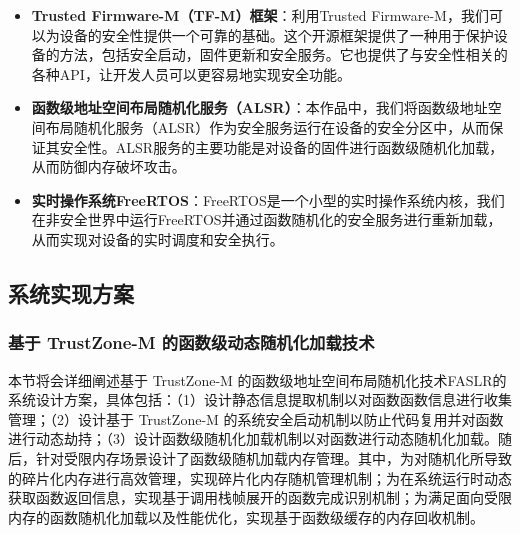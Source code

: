 \documentclass[UTF8,12pt,a4paper,twoside]{ctexart}
\numberwithin{figure}{section}
\begin{document}
\begin{itemize}
    \item \textbf{Trusted Firmware-M（TF-M）框架}：利用Trusted Firmware-M，我们可以为设备的安全性提供一个可靠的基础。这个开源框架提供了一种用于保护设备的方法，包括安全启动，固件更新和安全服务。它也提供了与安全性相关的各种API，让开发人员可以更容易地实现安全功能。
    \item \textbf{函数级地址空间布局随机化服务（ALSR）}：本作品中，我们将函数级地址空间布局随机化服务（ALSR）作为安全服务运行在设备的安全分区中，从而保证其安全性。ALSR服务的主要功能是对设备的固件进行函数级随机化加载，从而防御内存破坏攻击。
    \item \textbf{实时操作系统FreeRTOS}：FreeRTOS是一个小型的实时操作系统内核，我们在非安全世界中运行FreeRTOS并通过函数随机化的安全服务进行重新加载，从而实现对设备的实时调度和安全执行。
\end{itemize}

\subsection{系统实现方案}

\subsubsection{基于 TrustZone-M 的函数级动态随机化加载技术}
\par 本节将会详细阐述基于 TrustZone-M 的函数级地址空间布局随机化技术FASLR的系统设计方案，具体包括：（1）设计静态信息提取机制以对函数函数信息进行收集管理；（2）设计基于 TrustZone-M 的系统安全启动机制以防止代码复用并对函数进行动态劫持；（3）设计函数级随机化加载机制以对函数进行动态随机化加载。随后，针对受限内存场景设计了函数级随机加载内存管理。其中，为对随机化所导致的碎片化内存进行高效管理，实现碎片化内存随机管理机制；为在系统运行时动态获取函数返回信息，实现基于调用栈帧展开的函数完成识别机制；为满足面向受限内存的函数随机化加载以及性能优化，实现基于函数级缓存的内存回收机制。
\end{document}
